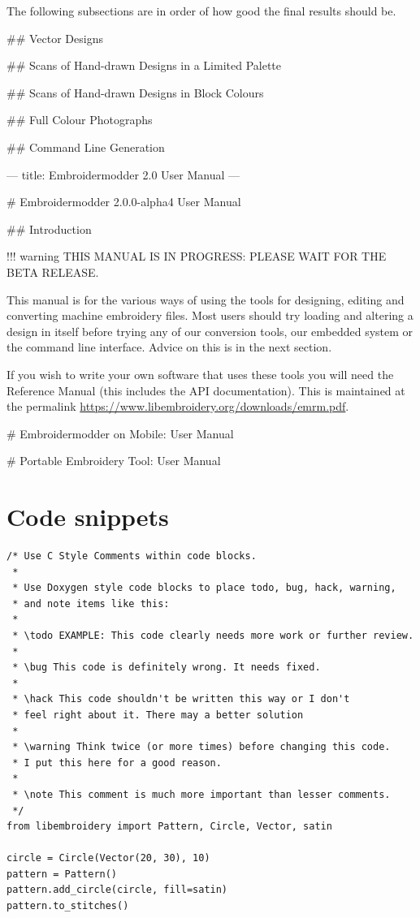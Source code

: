 The following subsections are in order of how good the final results should be.

## Vector Designs


## Scans of Hand-drawn Designs in a Limited Palette


## Scans of Hand-drawn Designs in Block Colours


## Full Colour Photographs

## Command Line Generation

---
title: Embroidermodder 2.0 User Manual
---

# Embroidermodder 2.0.0-alpha4  User Manual

## Introduction

!!! warning
    THIS MANUAL IS IN PROGRESS: PLEASE WAIT FOR THE BETA RELEASE.

This manual is for the various ways of using the \embname tools for designing,
editing and converting machine embroidery files. Most users should try loading and altering a design
in \embname itself before trying any of our conversion tools, our embedded system
or the command line interface. Advice on this is in the next section.

If you wish to write your own
software that uses these tools you will need the \embname Reference Manual (this
includes the API documentation). This is maintained at the permalink
\url{https://www.libembroidery.org/downloads/emrm.pdf}.

# Embroidermodder on Mobile: User Manual

# Portable Embroidery Tool: User Manual
\fi

\section{Code snippets}

\begin{lstlisting}
/* Use C Style Comments within code blocks.
 *
 * Use Doxygen style code blocks to place todo, bug, hack, warning,
 * and note items like this:
 *
 * \todo EXAMPLE: This code clearly needs more work or further review.
 *
 * \bug This code is definitely wrong. It needs fixed.
 *
 * \hack This code shouldn't be written this way or I don't
 * feel right about it. There may a better solution
 *
 * \warning Think twice (or more times) before changing this code.
 * I put this here for a good reason.
 *
 * \note This comment is much more important than lesser comments.
 */
from libembroidery import Pattern, Circle, Vector, satin

circle = Circle(Vector(20, 30), 10)
pattern = Pattern()
pattern.add_circle(circle, fill=satin)
pattern.to_stitches()
\end{lstlisting}

